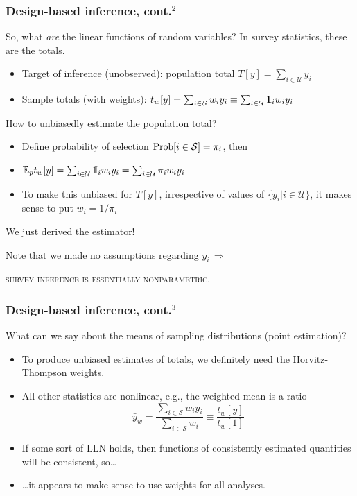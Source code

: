 \documentclass{beamer}
\newcommand{\Expect}{\mathbb{E}}
\newcommand{\One}{{\rm 1\kern-0.3em I}}
\begin{document}
\begin{frame}\frametitle{Design-based inference, cont.$^2$}

So, what \textit{are} the linear functions of random variables? In survey statistics, these are the totals.

\begin{itemize}
    \item Target of inference (unobserved): population total $T[y] = \sum_{i\in\mathcal{U}} y_i$
    \item Sample totals (with weights): $t_w[y] = \sum_{i\in\mathcal{S}} w_i y_i \equiv \sum_{i\in\mathcal{U}} \One_i w_i y_i$
\end{itemize}

How to unbiasedly estimate the population total?
\begin{itemize}
    \item Define probability of selection ${\rm Prob}[i\in\mathcal{S}]=\pi_i$, then
    \item $\Expect_p t_w[y] = \sum_{i\in\mathcal{U}} \One_i w_i y_i = \sum_{i\in\mathcal{U}} \pi_i w_i y_i$
    \item To make this unbiased for $T[y]$, irrespective of values of $\{ y_i| i\in \mathcal{U}\}$,
        it makes sense to put $w_i = 1/\pi_i$
\end{itemize}

We just derived the \citet{horvitz:thompson:1952} estimator!

\bigskip

Note that we made no assumptions regarding $y_i \, \Rightarrow$

\centering

\textsc{survey inference is essentially nonparametric}.

\end{frame}

\begin{frame}\frametitle{Design-based inference, cont.$^3$}

What can we say about the means of sampling distributions (point estimation)?

\begin{itemize}
    \item To produce unbiased estimates of totals, we definitely need the Horvitz-Thompson weights.
    \item All other statistics are nonlinear, e.g., the weighted mean is a ratio
        $$ \bar y_w = \frac{\sum_{i\in\mathcal{S}} w_i y_i}{\sum_{i\in\mathcal{S}} w_i} \equiv \frac{t_w[y]}{t_w[1]} $$
    \item If some sort of LLN holds, then functions of consistently estimated quantities
        will be consistent, so\ldots
    \item \ldots it appears to make sense to use weights for all analyses.
\end{itemize}

\end{frame}
\end{document}
